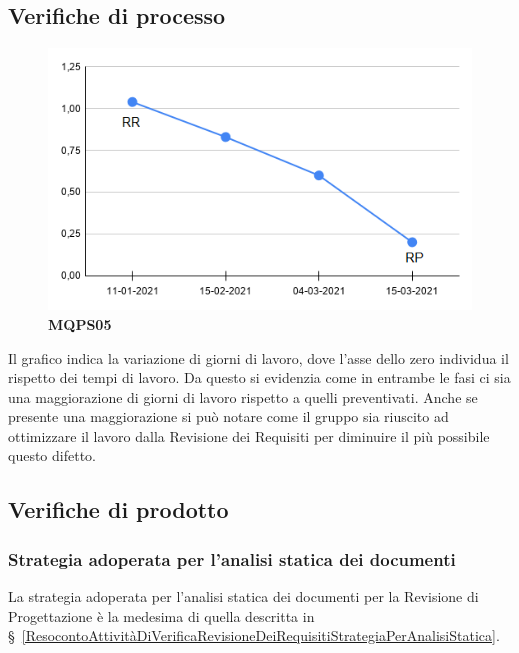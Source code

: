 {{\subsection{Verifiche di processo} \label{RevisioneDiProgettazioneVerificheDiProcesso}
\begin{center}
 \begin{figure}[H]
	 \includegraphics[width=1\linewidth]{../immagini/Metriche/MQPS05.png}
	 \caption{\textbf{MQPS05}}
 \end{figure}
\end{center}
Il grafico indica la variazione di giorni di lavoro, dove l'asse dello zero individua il rispetto dei tempi di lavoro. Da questo si evidenzia come in entrambe le fasi ci sia una maggiorazione di giorni di lavoro rispetto a quelli preventivati. Anche se presente una maggiorazione si può notare come il gruppo sia riuscito ad ottimizzare il lavoro dalla Revisione dei Requisiti per diminuire il più possibile questo difetto.
 \subsection{Verifiche di prodotto} \label{ResocontoAttivitàDiVerificaRevisioneDiProgettazioneVerificheDiProdotto}
\subsubsection{Strategia adoperata per l’analisi statica dei documenti} \label{ResocontoAttivitàDiVerificaRevisioneDiProgettazioneVerificheDiProdottoStrategiaPerAnalisiStatica}
La strategia adoperata per l’analisi statica dei documenti per la Revisione di Progettazione è la medesima di quella descritta in \S~\ref{ResocontoAttivitàDiVerificaRevisioneDeiRequisitiStrategiaPerAnalisiStatica}.
}}
